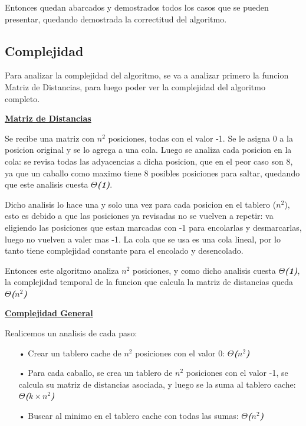 \documentclass[10pt,a4paper]{article}
\begin{document}
Entonces quedan abarcados y demostrados todos los casos que se pueden presentar, quedando demostrada la correctitud del algoritmo.

\subsection{Complejidad}
Para analizar la complejidad del algoritmo, se va a analizar primero la funcion Matriz de Distancias, para luego poder ver la complejidad del algoritmo completo.

\bigskip
\noindent \underline{\textbf{Matriz de Distancias}}

Se recibe una matriz con $n^2$ posiciones, todas con el valor -1. Se le asigna 0 a la posicion original y se lo agrega a una cola. Luego se analiza cada posicion en la cola: se revisa todas las adyacencias a dicha posicion, que en el peor caso son 8, ya que un caballo como maximo tiene 8 posibles posiciones para saltar, quedando que este analisis cuesta \textbf{\textit{$\Theta$(1)}}.

Dicho analisis lo hace una y solo una vez para cada posicion en el tablero ($n^2$), esto es debido a que las posiciones ya revisadas no se vuelven a repetir: va eligiendo las posiciones que estan marcadas con -1 para encolarlas y desmarcarlas, luego no vuelven a valer mas -1. La cola que se usa es una cola lineal, por lo tanto tiene complejidad constante para el encolado y desencolado.

Entonces este algoritmo analiza $n^2$ posiciones, y como dicho analisis cuesta \textbf{\textit{$\Theta$(1)}}, la complejidad temporal de la funcion que calcula la matriz de distancias queda \textbf{\textit{$\Theta$($n^2$)}}

\bigskip
\noindent \underline{\textbf{Complejidad General}}

Realicemos un analisis de cada paso:
\begin{itemize}
\item[•]Crear un tablero cache de $n^2$ posiciones con el valor 0: \textbf{\textit{$\Theta$($n^2$)}}
\item[•]Para cada caballo, se crea un tablero de $n^2$ posiciones con el valor -1, se calcula su matriz de distancias asociada, y luego se la suma al tablero cache: \textbf{\textit{$\Theta$($k \times n^2$)}}
\item[•]Buscar al minimo en el tablero cache con todas las sumas: \textbf{\textit{$\Theta$($n^2$)}}
\end{itemize}
\end{document}
